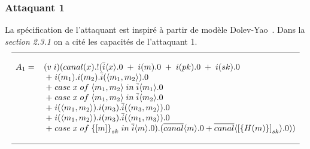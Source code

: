 \documentclass[10pt,a4paper]{article}
\begin{document}
\subsubsection{Attaquant 1}
La spécification de l'attaquant est inspiré à partir de modèle Dolev-Yao~\cite{ref3}. Dans la \textit{section 2.3.1} on a cité les capacités de l'attaquant 1.
\[ 
\begin{array}{l}
\hline
\\
A_{1}=\;\;\; (v\;i)(canal(x).!(\overline{i}\langle x \rangle.0\;+\;i(m).0\;+\;i(pk).0\;+\;i(sk).0\\
	   \;\;\;\;\;\;\;\;\;\;\;\;\;+\;i(m_1).i(m_2).\bar{i}(\langle m_1,m_2\rangle).0\\
	   \;\;\;\;\;\;\;\;\;\;\;\;\;+\;case\;x\;of\; \langle m_1,m_2\rangle\; in\; \overline{i}\langle m_1 \rangle.0\\
	   \;\;\;\;\;\;\;\;\;\;\;\;\;+\;case\;x\;of\;\langle m_1,m_2\rangle\; in\; \overline{i}\langle m_2 \rangle.0\\
	   \;\;\;\;\;\;\;\;\;\;\;\;\;+\;i(\langle m_1,m_2\rangle).i(m_3).\bar{i}(\langle m_3,m_2\rangle).0\\
	   \;\;\;\;\;\;\;\;\;\;\;\;\;+\;i(\langle m_1,m_2\rangle).i(m_3).\bar{i}(\langle m_1,m_3\rangle).0\\
	   \;\;\;\;\;\;\;\;\;\;\;\;\;+\;case\; x\; of\; {\lbrace [m]\rbrace}_{sk}\;in\;\overline{i}\langle m\rangle.0).
	   (\overline{canal}\langle m\rangle.0 + \overline{canal}\langle{[\lbrace H(m)\rbrace]}_{sk} \rangle.0 ))\\	  
\\
\hline
\end{array}       
\]
\end{document}
